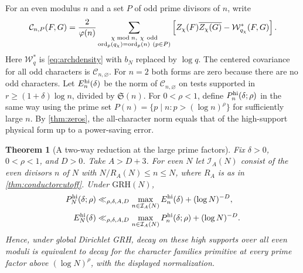 \documentclass[11pt,a4paper]{article}
\numberwithin{equation}{section}
\newtheorem{theorem}{Theorem}[section]
\newcommand{\SSS}{\mathfrak S}
\newcommand{\grh}{\mathrm{GRH}}
\begin{document}
For an even modulus $n$ and a set $P$ of odd prime divisors of
$n$, write
\[
 \mathcal C_{n,P}(F,G)
  =\frac2{\varphi(n)}
   \sum_{\substack{\chi\bmod n,\ \chi\ {\rm odd}\\
          \operatorname{ord}_p(q_\chi)=\operatorname{ord}_p(n)
          \ (p\in P)}}
       \left[ Z_\chi(F)\overline{Z_\chi(G)}
                         -\mathcal W_{q_\chi}^{*}(F,G)\right].
\]
Here $\mathcal W_q^{*}$ is \cref{eq:archdensity} with $b_N$
replaced by $\log q$. The centered covariance for all odd
characters is $\mathcal C_{n,\varnothing}$. For $n=2$
both forms are zero because there are no odd characters.
Let $E_n^{\rm hi}(\delta)$ be the norm of
$\mathcal C_{n,\varnothing}$ on tests supported in
$r\ge(1+\delta)\log n$, divided by $\SSS(n)$.
For $0<\rho<1$, define $P_n^{\rm hi}(\delta;\rho)$ in
the same way using the prime set
$P(n)=\{p\mid n:p>(\log n)^\rho\}$ for sufficiently large $n$.
By \cref{thm:zeros}, the all-character norm equals that of
the high-support physical form up to a power-saving error.

\begin{theorem}[A two-way reduction at the large prime factors]
\label{thm:largeprimeconductors}
Fix $\delta>0$, $0<\rho<1$, and $D>0$. Take $A>D+3$.
For even $N$ let $\mathcal I_A(N)$ consist of the even
divisors $n$ of $N$ with $N/R_A(N)\le n\le N$, where
$R_A$ is as in \cref{thm:conductorcutoff}. Under $\grh(N)$,
\begin{align}
 P_N^{\rm hi}(\delta;\rho)
   &\ll_{\rho,\delta,A,D}
          \max_{n\in\mathcal I_A(N)} E_n^{\rm hi}(\delta)
                 +(\log N)^{-D}, \notag\\
 E_N^{\rm hi}(\delta)
   &\ll_{\rho,\delta,A,D}
          \max_{n\in\mathcal I_A(N)} P_n^{\rm hi}(\delta;\rho)
                 +(\log N)^{-D}.
 \label{eq:largeprimeconductors}
\end{align}
Hence, under global Dirichlet GRH, decay on these high
supports over all even moduli is equivalent to decay for
the character families primitive at every prime factor
above $(\log N)^\rho$, with the displayed normalization.
\end{theorem}
\end{document}
